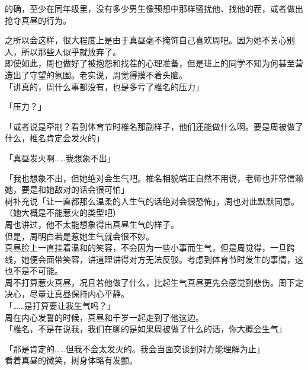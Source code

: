 的确，至少在同年级里，没有多少男生像预想中那样骚扰他、找他的茬，或者做出抢夺真昼的行为。

之所以会这样，很大程度上是由于真昼毫不掩饰自己喜欢周吧。因为她不关心别人，所以那些人似乎就放弃了。\\

即使如此，周也做好了被抱怨和找茬的心理准备，但是班上的同学不知为何甚至营造出了守望的氛围。老实说，周觉得摸不着头脑。\\

「讲真的，周什么事都没有，也是多亏了椎名的压力」

「压力？」

「或者说是牵制？看到体育节时椎名那副样子，他们还能做什么啊。要是周被做了什么，椎名肯定会发火的」

「真昼发火啊……我想象不出」

「我也想象不出，但她绝对会生气吧。椎名相貌端正自然不用说，老师也非常信赖她，要是和她敌对的话会很可怕」\\

树补充说「让一直都那么温柔的人生气的话绝对会很恐怖」，周也对此默默同意。\\

（她大概是不能惹火的类型吧）\\

周也讲过，他不太能想象得出真昼生气的样子。\\

但是，周明白若是惹她生气就会很不妙。\\

真昼脸上一直挂着温和的笑容，不会因为一些小事而生气，但是周觉得，一旦跨线，她便会面带笑容，讲道理讲得对方无法反驳。考虑到体育节时发生的事情，这也不是不可能。\\

周不打算惹火真昼，况且若他做了什么，比起生气真昼更先会感觉到悲伤。周下定决心，尽量让真昼保持内心平静。\\

「……是打算要让我生气吗？」\\

周在内心发誓的时候，真昼和千岁一起走到了他这边。\\

「椎名，不是在说我，我们在聊的是如果周被做了什么的话，你大概会生气」

「那是肯定的……但我不会太发火的。我会当面交谈到对方能理解为止」\\

看着真昼的微笑，树身体略有发颤。\\

